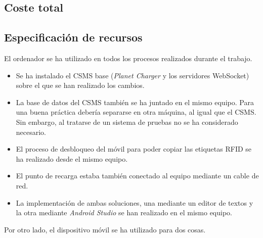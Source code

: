 \documentclass[12pt,a4paper,onecolumn,oneside]{report}
\begin{document}
\subsection{Coste total}

\begin{table}[ht]
	\centering
	\caption{Presupuesto total}
	\label{tabla3}
\end{table}

\subsection{Especificación de recursos}

El ordenador se ha utilizado en todos los procesos realizados durante el trabajo.

\begin{itemize}
\item Se ha instalado el CSMS base (\textit{Planet Charger} y los servidores WebSocket) sobre el que se han realizado los cambios.
\item La base de datos del CSMS también se ha juntado en el mismo equipo. Para una buena práctica debería separarse en otra máquina, al igual que el CSMS. Sin embargo, al tratarse de un sistema de pruebas no se ha considerado necesario.
\item El proceso de desbloqueo del móvil para poder copiar las etiquetas RFID se ha realizado desde el mismo equipo.
\item El punto de recarga estaba también conectado al equipo mediante un cable de red.
\item La implementación de ambas soluciones, una mediante un editor de textos y la otra mediante \textit{Android Studio} se han realizado en el mismo equipo.
\end{itemize}

Por otro lado, el dispositivo móvil se ha utilizado para dos cosas.
\end{document}
